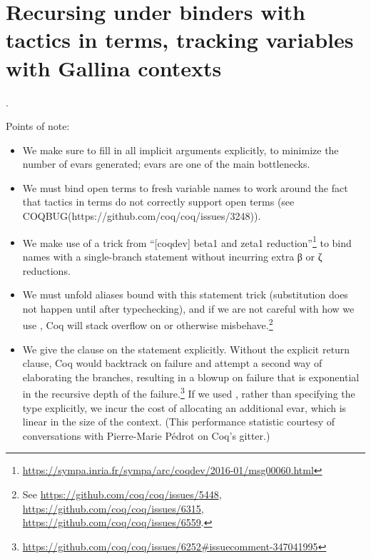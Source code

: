 \begin{coqdoccode}
\end{coqdoccode}
\section{Recursing under binders with tactics in terms, tracking variables with Gallina contexts}

\begin{coqdoccode}
\coqdocnoindent
{}  .\coqdoceol
\coqdocemptyline
\end{coqdoccode}
Points of note:



\begin{itemize}
\item  We make sure to fill in all implicit arguments explicitly, to
      minimize the number of evars generated; evars are one of the
      main bottlenecks.



\item  We must bind open terms to fresh variable names to work around
      the fact that tactics in terms do not correctly support open
      terms (see COQBUG(https://github.com/coq/coq/issues/3248)).



\item  We make use of a trick from ``[coqdev] beta1 and zeta1
      reduction''\footnote{\url{https://sympa.inria.fr/sympa/arc/coqdev/2016-01/msg00060.html}}
      to bind names with a single-branch  statement without
      incurring extra β or ζ reductions.



\item  We must unfold aliases bound with this  statement trick
      (substitution does not happen until after typechecking), and if
      we are not careful with how we use , Coq will stack
      overflow on   or otherwise misbehave.\footnote{See
      \url{https://github.com/coq/coq/issues/5448},
      \url{https://github.com/coq/coq/issues/6315},
      \url{https://github.com/coq/coq/issues/6559}.}



\item  We give the  clause on the  statement explicitly.
      Without the explicit return clause, Coq would backtrack on
      failure and attempt a second way of elaborating the 
      branches, resulting in a blowup on failure that is exponential
      in the recursive depth of the
      failure.\footnote{\url{https://github.com/coq/coq/issues/6252\#issuecomment-347041995}}
      If we used  \coqdocvar{\_}, rather than specifying the type
      explicitly, we incur the cost of allocating an additional evar,
      which is linear in the size of the context.  (This performance
      statistic courtesy of conversations with Pierre-Marie Pédrot on
      Coq's gitter.)




\end{itemize}
